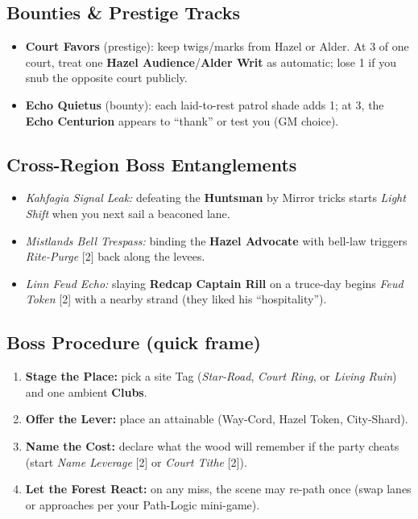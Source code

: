 \subsection*{Bounties \& Prestige Tracks}
\begin{itemize}
  \item \textbf{Court Favors} (prestige): keep twigs/marks from Hazel or Alder. At 3 of one court, treat one \textbf{Hazel Audience}/\textbf{Alder Writ} as automatic; lose 1 if you snub the opposite court publicly.
  \item \textbf{Echo Quietus} (bounty): each laid-to-rest patrol shade adds 1; at 3, the \textbf{Echo Centurion} appears to “thank” or test you (GM choice).
\end{itemize}

\subsection*{Cross-Region Boss Entanglements}
\begin{itemize}
  \item \emph{Kahfagia Signal Leak:} defeating the \textbf{Huntsman} by Mirror tricks starts \emph{Light Shift} when you next sail a beaconed lane.
  \item \emph{Mistlands Bell Trespass:} binding the \textbf{Hazel Advocate} with bell-law triggers \emph{Rite-Purge} [2] back along the levees.
  \item \emph{Linn Feud Echo:} slaying \textbf{Redcap Captain Rill} on a truce-day begins \emph{Feud Token} [2] with a nearby strand (they liked his “hospitality”).
\end{itemize}

\subsection*{Boss Procedure (quick frame)}
\begin{enumerate}
  \item \textbf{Stage the Place:} pick a site Tag (\emph{Star-Road}, \emph{Court Ring}, or \emph{Living Ruin}) and one ambient \textbf{Clubs}.
  \item \textbf{Offer the Lever:} place an attainable \Diamond{} (Way-Cord, Hazel Token, City-Shard).
  \item \textbf{Name the Cost:} declare what the wood will remember if the party cheats (start \emph{Name Leverage} [2] or \emph{Court Tithe} [2]).
  \item \textbf{Let the Forest React:} on any miss, the scene may re-path once (swap lanes or approaches per your Path-Logic mini-game).
\end{enumerate}